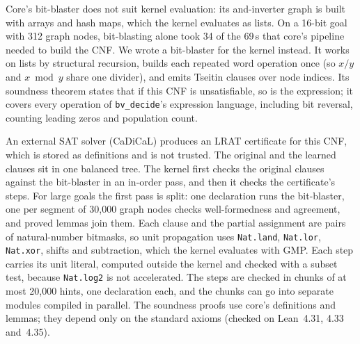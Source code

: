 \documentclass[11pt]{article}
\begin{document}
Core's bit-blaster does not suit kernel evaluation: its and-inverter graph is built with arrays and
hash maps, which the kernel evaluates as lists. On a 16-bit goal with 312 graph nodes, bit-blasting
alone took 34 of the 69\,s that core's pipeline needed to build the CNF. We wrote a bit-blaster for
the kernel instead. It works on lists by structural recursion, builds each repeated word operation once
(so \(x/y\) and \(x \bmod y\) share one divider), and emits Tseitin clauses over node indices. Its
soundness theorem states that if this CNF is unsatisfiable, so is the expression; it covers every
operation of \texttt{bv\_decide}'s expression language, including bit reversal, counting leading
zeros and population count.

An external SAT solver (CaDiCaL) produces an LRAT certificate for this CNF, which is stored as
definitions and is not trusted. The original and the learned clauses sit in one balanced tree. The
kernel first checks the original clauses against the bit-blaster in an in-order pass, and then it checks the
certificate's steps. For large goals the first pass is split: one declaration runs the bit-blaster,
one per segment of 30,000 graph nodes checks well-formedness and agreement, and proved lemmas join
them. Each clause and the partial assignment are pairs of natural-number bitmasks,
so unit propagation uses \texttt{Nat.land}, \texttt{Nat.lor}, \texttt{Nat.xor}, shifts and
subtraction, which the kernel evaluates with GMP. Each step carries its unit literal, computed
outside the kernel and checked with a subset test, because \texttt{Nat.log2} is not accelerated.
The steps are checked in chunks of at most 20,000 hints, one declaration each, and the chunks can
go into separate modules compiled in parallel. The soundness proofs use core's definitions and
lemmas; they depend only on the standard axioms (checked on Lean~4.31, 4.33 and~4.35).
\end{document}
